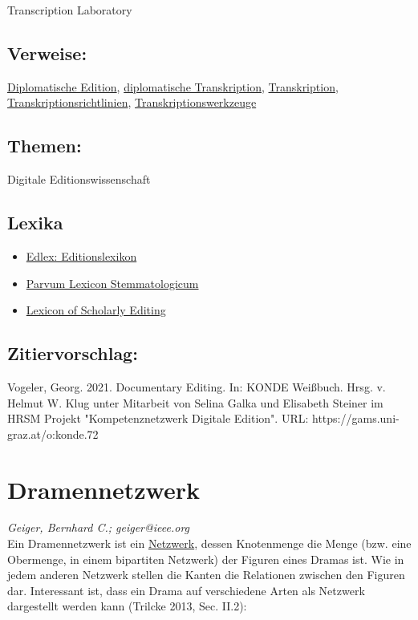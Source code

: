 \documentclass{article}
\begin{document}
{                           Transcription Laboratory}\subsection*{Verweise:}\href{https://gams.uni-graz.at/o:konde.65}{Diplomatische Edition}, \href{https://gams.uni-graz.at/o:konde.66}{diplomatische Transkription}, \href{https://gams.uni-graz.at/o:konde.197}{Transkription}, \href{https://gams.uni-graz.at/o:konde.198}{Transkriptionsrichtlinien}, \href{https://gams.uni-graz.at/o:konde.199}{Transkriptionswerkzeuge}\subsection*{Themen:}Digitale Editionswissenschaft\subsection*{Lexika}\begin{itemize}\item \href{https://edlex.de/index.php?title=Documentary_editing}{Edlex: Editionslexikon}\item \href{https://wiki.helsinki.fi/display/stemmatology/Edition%2C+documentary}{Parvum Lexicon Stemmatologicum}\item \href{https://lexiconse.uantwerpen.be/index.php/lexicon/documentary-editing/}{Lexicon of Scholarly Editing}\end{itemize}\subsection*{Zitiervorschlag:}Vogeler, Georg. 2021. Documentary Editing. In: KONDE Weißbuch. Hrsg. v. Helmut W. Klug unter Mitarbeit von Selina Galka und Elisabeth Steiner im HRSM Projekt "Kompetenznetzwerk Digitale Edition". URL: https://gams.uni-graz.at/o:konde.72\newpage\section*{Dramennetzwerk} \emph{Geiger, Bernhard C.; geiger@ieee.org }\\
        
    Ein Dramennetzwerk ist ein \href{http://gams.uni-graz.at/o:konde.144}{Netzwerk}, dessen Knotenmenge die Menge (bzw. eine Obermenge, in einem bipartiten Netzwerk) der Figuren eines Dramas ist. Wie in jedem anderen Netzwerk stellen die Kanten die Relationen zwischen den Figuren dar. Interessant ist, dass ein Drama auf verschiedene Arten als Netzwerk dargestellt werden kann (Trilcke 2013, Sec. II.2):\\
            
\end{document}
